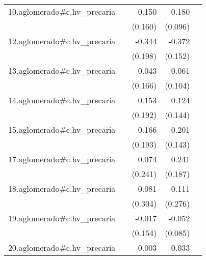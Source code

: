 {\begin{longtable}{l*{4}{D{.}{.}{-1}}}
\addlinespace
10.aglomerado#c.hv\_precaria&                     &      -0.150         &      -0.180         &                     \\
            &                     &     (0.160)         &     (0.096)         &                     \\
\addlinespace
12.aglomerado#c.hv\_precaria&                     &      -0.344         &      -0.372\sym{*}  &                     \\
            &                     &     (0.198)         &     (0.152)         &                     \\
\addlinespace
13.aglomerado#c.hv\_precaria&                     &      -0.043         &      -0.061         &                     \\
            &                     &     (0.166)         &     (0.104)         &                     \\
\addlinespace
14.aglomerado#c.hv\_precaria&                     &       0.153         &       0.124         &                     \\
            &                     &     (0.192)         &     (0.144)         &                     \\
\addlinespace
15.aglomerado#c.hv\_precaria&                     &      -0.166         &      -0.201         &                     \\
            &                     &     (0.193)         &     (0.143)         &                     \\
\addlinespace
17.aglomerado#c.hv\_precaria&                     &       0.074         &       0.241         &                     \\
            &                     &     (0.241)         &     (0.187)         &                     \\
\addlinespace
18.aglomerado#c.hv\_precaria&                     &      -0.081         &      -0.111         &                     \\
            &                     &     (0.304)         &     (0.276)         &                     \\
\addlinespace
19.aglomerado#c.hv\_precaria&                     &      -0.017         &      -0.052         &                     \\
            &                     &     (0.154)         &     (0.085)         &                     \\
\addlinespace
20.aglomerado#c.hv\_precaria&                     &      -0.003         &      -0.033         &                     \\

\end{longtable}}
